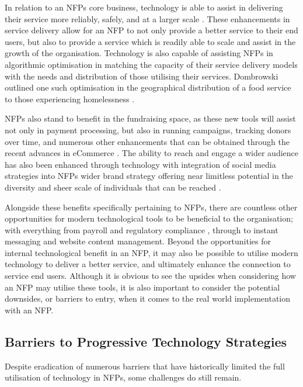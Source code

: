In relation to an NFPs core business, technology is able to assist in delivering their service more reliably, safely, and at a larger scale \cite{boles2013technology}. These enhancements in service delivery allow for an NFP to not only provide a better service to their end users, but also to provide a service which is readily able to scale and assist in the growth of the organisation. Technology is also capable of assisting NFPs in algorithmic optimisation in matching the capacity of their service delivery models with the needs and distribution of those utilising their services. Dombrowski outlined one such optimisation in the geographical distribution of a food service to those experiencing homelessness \cite{dombrowski2013takes}.

NFPs also stand to benefit in the fundraising space, as these new tools will assist not only in payment processing, but also in running campaigns, tracking donors over time, and numerous other enhancements that can be obtained through the recent advances in eCommerce \cite{goecks2008charitable} \cite{boeder2002non}. The ability to reach and engage a wider audience has also been enhanced through technology with integration of social media strategies into NFPs wider brand strategy offering near limitless potential in the diversity and sheer scale of individuals that can be reached \cite{lovejoy2012information} \cite{nah2013modeling} \cite{wyllie2016examination} \cite{milde2017strategies}.

Alongside these benefits specifically pertaining to NFPs, there are countless other opportunities for modern technological tools to be beneficial to the organisation; with everything from payroll and regulatory compliance \cite{mahajan2015review}, through to instant messaging and website content management. Beyond the opportunities for internal technological benefit in an NFP, it may also be possible to utilise modern technology to deliver a better service, and ultimately enhance the connection to service end users. Although it is obvious to see the upsides when considering how an NFP may utilise these tools, it is also important to consider the potential downsides, or barriers to entry, when it comes to the real world implementation with an NFP.

\subsection{Barriers to Progressive Technology Strategies}

Despite eradication of numerous barriers that have historically limited the full utilisation of technology in NFPs, some challenges do still remain. 


